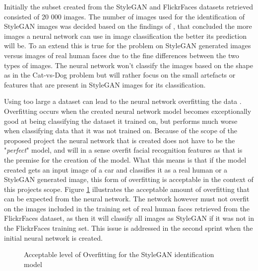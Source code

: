 Initially the subset created from the StyleGAN and FlickrFaces datasets retrieved consisted of 20 000 images. The number of images used for the identification of StyleGAN images was decided based on the findings of \cite{Nasr2016}, that concluded the more images a neural network can use in image classification the better its prediction will be. To an extend this is true for the problem on StyleGAN generated images versus images of real human faces due to the fine differences between the two types of images. The neural network won't classify the images based on the shape as in the Cat-vs-Dog problem but will rather focus on the small artefacts or features that are present in StyleGAN images for its classification. 

Using too large a dataset can lead to the neural network overfitting the data \citep{Trask2019}. Overfitting occurs when the created neural network model becomes exceptionally good at being classifying the dataset it trained on, but performs much worse when classifying data that it was not trained on. Because of the scope of the proposed project the neural network that is created does not have to be the "\textit{perfect}" model, and will in a sense overfit facial recognition features as that is the premise for the creation of the model. What this means is that if the model created gets an input image of a car and classifies it as a real human or a StyleGAN generated image, this form of overfitting is acceptable in the context of this projects scope. Figure \ref{fig:11} illustrates the acceptable amount of overfitting that can be expected from the neural network. The network however must not overfit on the images included in the training set of real human faces retrieved from the FlickrFaces dataset, as then it will classify all images as StyleGAN if it was not in the FlickrFaces training set. This issue is addressed in the second sprint when the initial neural network is created. 
  
\begin{figure}[H]%
\centering
{}%
\caption{Acceptable level of Overfitting for the StyleGAN identification model}%
\label{fig:11}%
\end{figure}
  
